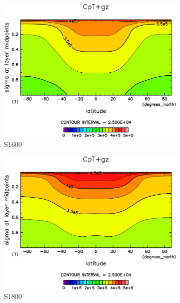 \documentclass[body]{subfiles}
\begin{document}
\begin{figure}[t]
\begin{subfigure}{.4\textwidth}
		\includegraphics[width=\textwidth]{S1600/CpT+gz,time=3650:4015-crop-rotate.pdf}
		\caption{S1600}\label{CpT+gzS1600}
	\end{subfigure}
	\begin{subfigure}{.4\textwidth}
		\centering
		\includegraphics[width=\textwidth]{S1800/CpT+gz,time=3650:4015-crop-rotate.pdf}
		\caption{S1800}\label{CpT+gzS1800}
	\end{subfigure}
	\begin{subfigure}{.4\textwidth}
		\centering

\end{subfigure}
\end{figure}
\end{document}
